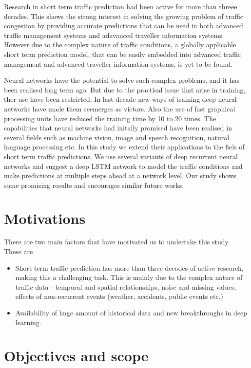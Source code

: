 Research in short term traffic prediction had been active for more than threee decades. This shows the
strong interest in solving the growing problem of traffic congestion by providing accurate predictions
that can be used in both advanced traffic management systems and adavanced traveller information systems.
However due to the complex nature of traffic conditions, a globally applicable short term prediction
model, that can be easily embedded into advanced traffic management and advanced traveller information
systems, is yet to be found.

Neural networks have the potential to solve such complex problems, and it has been realised long term
ago. But due to the practical issue that arise in training, ther use have been restricted. In last
decade new ways of training deep neural networks have made them reemerges as victors. Also the use
of fast graphical processing units have reduced the training time by 10 to 20 times. The capabilities
that neural networks had initally promised have been realised in several fields such as machine
vision, image and speech recognition, natural language processing etc. In this study we extend their
applications to the fiels of short term traffic predictions. We use several variants of deep recurrent
neural networks and suggest a deep LSTM network to model the traffic conditions and make predictions
at multiple steps ahead at a network level. Our study shows some promising results and encourages
similar future works.


\section{Motivations}
There are two main factors that have motivated us to undertake this study. These are

\begin{itemize}
\item Short term traffic prediction has more than three decades of active research, making this a
challenging task. This is mainly due to the complex nature of traffic data - temporal and spatial
relationships, noise and missing values, effects of non-recurrent events (weather, accidents,
public events etc.)

\item Availability of huge amount of historical data and new breakthroughs in deep learning.

\end{itemize}

\section{Objectives and scope}

